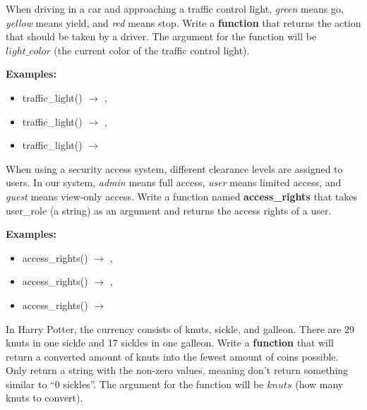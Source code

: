 


	\item
		When driving in a car and approaching a traffic control light, \textit{green} means go, 
		\textit{yellow} means yield, and \textit{red} means stop. Write a \textbf{function} that returns the action 
		that should be taken by a driver. The argument for the function will be 
		$light\_color$ (the current color of the traffic control light).

	\textbf{Examples:}
	\begin{itemize}
		\item  traffic\_light() $\rightarrow$ , 
		\item  traffic\_light() $\rightarrow$ , 
		\item  traffic\_light() $\rightarrow$ 
	\end{itemize}


	\item
		When using a security access system, different clearance levels are assigned to users. 
		In our system, \textit{admin} means full access, \textit{user} means limited access, 
		and \textit{guest} means view-only access. Write a function named \textbf{access\_rights} 
		that takes user\_role (a string) as an argument and returns the access rights of a user. 

	\textbf{Examples:}
	\begin{itemize}
		\item  access\_rights() $\rightarrow$ , 
		\item  access\_rights() $\rightarrow$ , 
		\item  access\_rights() $\rightarrow$ 
	\end{itemize}





	\item 
		In Harry Potter, the currency consists of knuts, sickle, and galleon. There are 29 knuts in 
		one sickle and 17 sickles in one galleon. Write a \textbf{function} that will return a 
		converted amount of knuts into the fewest amount of coins possible. Only return a string 
		with the non-zero values, meaning don't return something similar to ``0 sickles''. The 
		argument for the function will be $knuts$ (how many knuts to convert). 

